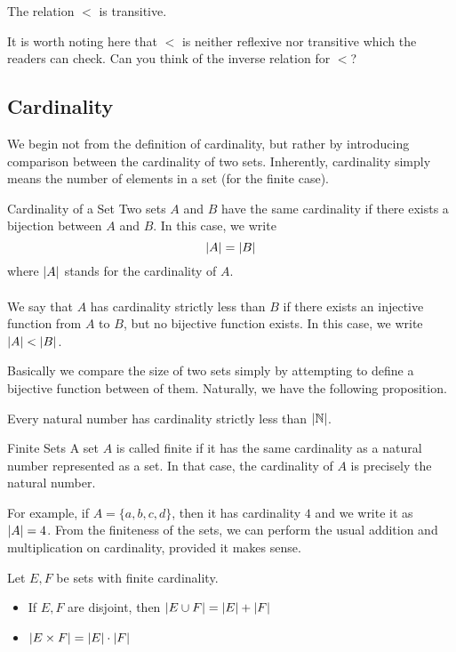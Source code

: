 \documentclass[a4paper]{article}
\begin{document}
\begin{prp}{}{} The relation $<$ is transitive. 
\end{prp}

It is worth noting here that $<$ is neither reflexive nor transitive which the readers can check. Can you think of the inverse relation for $<$?

\subsection{Cardinality}
We begin not from the definition of cardinality, but rather by introducing comparison between the cardinality of two sets. Inherently, cardinality simply means the number of elements in a set (for the finite case). 

\begin{defn}{Cardinality of a Set}{} Two sets $A$ and $B$ have the same cardinality if there exists a bijection between $A$ and $B$. In this case, we write $$\abs{A}=\abs{B}$$ where $\abs{A}$ stands for the cardinality of $A$. \\~\\
We say that $A$ has cardinality strictly less than $B$ if there exists an injective function from $A$ to $B$, but no bijective function exists. In this case, we write $\abs{A}<\abs{B}$. 
\end{defn}

Basically we compare the size of two sets simply by attempting to define a bijective function between of them. Naturally, we have the following proposition. 

\begin{prp}{}{} Every natural number has cardinality strictly less than $\abs{\mathbb{N}}$. 
\end{prp}

\begin{defn}{Finite Sets}{} A set $A$ is called finite if it has the same cardinality as a natural number represented as a set. In that case, the cardinality of $A$ is precisely the natural number. 
\end{defn}

For example, if $A=\{a,b,c,d\}$, then it has cardinality $4$ and we write it as $\abs{A}=4$. From the finiteness of the sets, we can perform the usual addition and multiplication on cardinality, provided it makes sense. 

\begin{prp}{}{} Let $E,F$ be sets with finite cardinality. 
\begin{itemize}
\item If $E,F$ are disjoint, then $\abs{E\cup F}=\abs{E}+\abs{F}$
\item $\abs{E\times F}=\abs{E}\cdot\abs{F}$
\end{itemize}
\end{prp}
\end{document}
